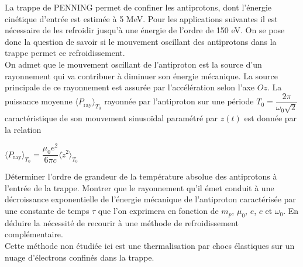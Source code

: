\documentclass[12pt,french,twoside]{exam}
\begin{document}
\begin{questions}
La trappe de PENNING permet de confiner les antiprotons, dont l’énergie cinétique d’entrée est estimée à 5 MeV. Pour les applications suivantes il est nécessaire de les refroidir jusqu’à une énergie de l’ordre de 150 eV. On se pose donc la question de savoir si le mouvement oscillant des antiprotons dans la trappe permet ce refroidissement.\\ 

On admet que le mouvement oscillant de l’antiproton est la source d’un rayonnement qui va contribuer à diminuer son énergie mécanique. La source principale de ce rayonnement est assurée par l’accélération selon l’axe $Oz$. La puissance moyenne $\langle P_{\text{ray}}\rangle_{T_0}$  rayonnée par l’antiproton sur une période $T_0 = \dfrac{2\pi}{\omega_0\sqrt{2}}$ caractéristique de son mouvement sinusoïdal paramétré par $z(t)$ est donnée par la relation 
\begin{center}
$ \langle P_{\text{ray}}\rangle_{T_0} = \dfrac{\mu_0e^2}{6\pi c}\langle \ddot{z}^2\rangle_{T_0}$
\end{center}
\item Déterminer l’ordre de grandeur de la température absolue des antiprotons à l’entrée de la trappe. Montrer que le rayonnement qu’il émet conduit à une décroissance exponentielle de l’énergie mécanique de l’antiproton caractérisée par une constante de temps $\tau$ que l’on exprimera en fonction de $m_p$, $\mu_0$, $e$, $c$ et $\omega_0$. En déduire la nécessité de recourir à une méthode de refroidissement complémentaire. \\

Cette méthode non étudiée ici est une thermalisation par chocs élastiques sur un nuage d’électrons confinés dans la trappe.
\end{questions}
\end{document}
